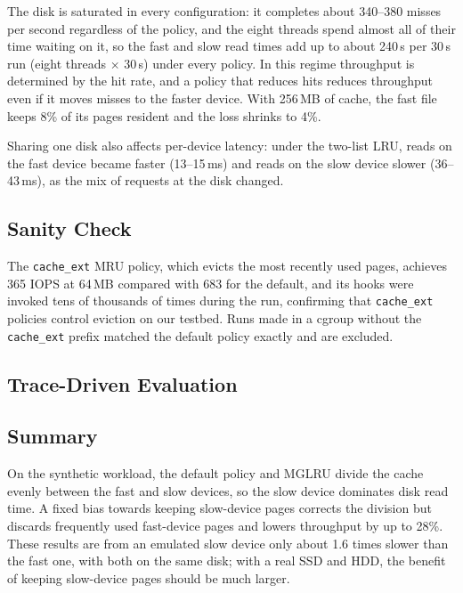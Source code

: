 \documentclass[11pt,sigconf,nonacm]{acmart}
\newcommand{\cacheExt}{\texttt{cache\_ext}}
\begin{document}
The disk is saturated in every configuration: it completes about 340--380 misses per second regardless of the policy, and the eight threads spend almost all of their time waiting on it, so the fast and slow read times add up to about 240\,s per 30\,s run (eight threads $\times$ 30\,s) under every policy. In this regime throughput is determined by the hit rate, and a policy that reduces hits reduces throughput even if it moves misses to the faster device. With 256\,MB of cache, the fast file keeps 8\% of its pages resident and the loss shrinks to 4\%.

Sharing one disk also affects per-device latency: under the two-list LRU, reads on the fast device became faster (13--15\,ms) and reads on the slow device slower (36--43\,ms), as the mix of requests at the disk changed.

\subsection{Sanity Check}

The \cacheExt{} MRU policy, which evicts the most recently used pages, achieves 365 IOPS at 64\,MB compared with 683 for the default, and its hooks were invoked tens of thousands of times during the run, confirming that \cacheExt{} policies control eviction on our testbed. Runs made in a cgroup without the \texttt{cache\_ext} prefix matched the default policy exactly and are excluded.

\subsection{Trace-Driven Evaluation}


\subsection{Summary}

On the synthetic workload, the default policy and MGLRU divide the cache evenly between the fast and slow devices, so the slow device dominates disk read time. A fixed bias towards keeping slow-device pages corrects the division but discards frequently used fast-device pages and lowers throughput by up to 28\%. These results are from an emulated slow device only about 1.6 times slower than the fast one, with both on the same disk; with a real SSD and HDD, the benefit of keeping slow-device pages should be much larger.
\end{document}
